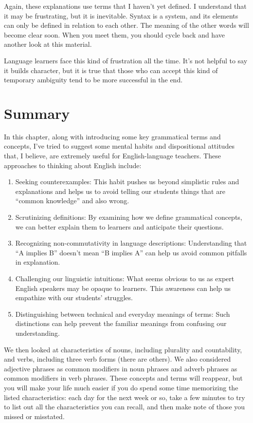 Again, these explanations use terms that I haven't yet defined. I understand that it may be frustrating, but it is inevitable. Syntax is a system, and its elements can only be defined in relation to each other. The meaning of the other words will become clear soon. When you meet them, you should cycle back and have another look at this material.

Language learners face this kind of frustration all the time. It's not helpful to say it builds character, but it is true that those who can accept this kind of temporary ambiguity tend to be more successful in the end.

\section{Summary}
In this chapter, along with introducing some key grammatical terms and concepts, I've tried to suggest some mental habits and dispositional attitudes that, I believe, are extremely useful for English-language teachers. These approaches to thinking about English include:
\begin{enumerate}[noitemsep]
    \item Seeking counterexamples: This habit pushes us beyond simplistic rules and explanations and helps us to avoid telling our students things that are ``common knowledge'' and also wrong.
    \item Scrutinizing definitions: By examining how we define grammatical concepts, we can better explain them to learners and anticipate their questions.
    \item Recognizing non-commutativity in language descriptions: Understanding that ``A implies B'' doesn't mean ``B implies A'' can help us avoid common pitfalls in explanation.
    \item Challenging our linguistic intuitions: What seems obvious to us as expert English speakers may be opaque to learners. This awareness can help us empathize with our students' struggles.
    \item Distinguishing between technical and everyday meanings of terms: Such distinctions can help prevent the familiar meanings from confusing our understanding.
\end{enumerate}

We then looked at characteristics of nouns, including plurality and countability, and verbs, including three verb forms (there are others). We also considered adjective phrases as common modifiers in noun phrases and adverb phrases as common modifiers in verb phrases. These concepts and terms will reappear, but you will make your life much easier if you do spend some time memorizing the listed characteristics: each day for the next week or so, take a few minutes to try to list out all the characteristics you can recall, and then make note of those you missed or misstated.

